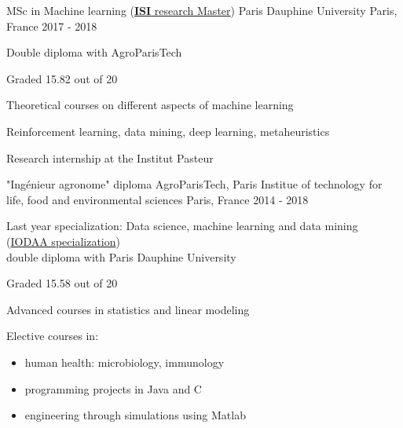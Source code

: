 

\begin{cventries}

  \cventry
    {MSc in Machine learning (\href{https://mido.dauphine.fr/fr/formations-et-diplomes/masters-2/master-2-informatique/parcours-isi/presentation.html}{\textbf{ISI} research Master})} %
    {Paris Dauphine University} %
    {Paris, France} %
    {2017 - 2018} %
    {
      \begin{cvitems} %
        \item {Double diploma with AgroParisTech}
        \item {Graded 15.82 out of 20}
        \item {Theoretical courses on different aspects of machine learning}
        \item {Reinforcement learning, data mining, deep learning, metaheuristics} 
        \item {Research internship at the Institut Pasteur}
      \end{cvitems}
    }
  
    \cventry
    {"Ingénieur agronome" diploma} %
    {AgroParisTech, Paris Institue of technology for life, food and environmental sciences} %
    {Paris, France} %
    {2014 - 2018} %
    {
      \begin{cvitems} %
        \item {Last year specialization: Data science, machine learning and data mining (\href{http://www2.agroparistech.fr/ufr-info/iodaa/}{IODAA specialization})\\ double diploma with Paris Dauphine University}
        \item {Graded 15.58 out of 20}
        \item {Advanced courses in statistics and linear modeling}
        \item {Elective courses in: \begin{itemize}
          \item human health: microbiology, immunology
          \item programming projects in Java and C
          \item engineering through simulations using Matlab
        \end{itemize}}
      \end{cvitems}
    }


\end{cventries}
